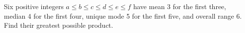 Six positive integers $a\le b\le c\le d\le e\le f$ have mean 3 for the first three, median 4 for the first four, unique mode 5 for the first five, and overall range 6. Find their greatest possible product.
